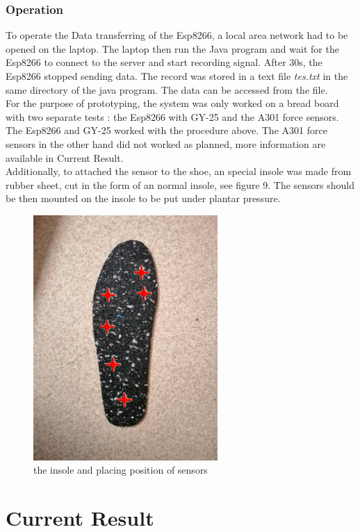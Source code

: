\documentclass[12pt,a4paper]{article}
\begin{document}
\subsubsection{Operation}
To operate the Data transferring of the Esp8266, a local area network had to be opened on the laptop. The laptop then run the Java program and wait for the Esp8266 to connect to the server and start recording signal. After 30s, the Esp8266 stopped sending data. The record was stored in a text file \textit{tes.txt} in the same directory of the java program. The data can be accessed from the file.\\ 
For the purpose of prototyping, the system was only worked on a bread board with two separate tests : the Esp8266 with GY-25 and the A301 force sensors. The Esp8266 and GY-25 worked with the procedure above. The A301 force sensors in the other hand did not worked as planned, more information are available in Current Result.\\
Additionally, to attached the sensor to the shoe, an special insole was made from rubber sheet, cut in the form of an normal insole, see figure 9. The sensors should be then mounted on the insole to be put under plantar pressure.\\
\begin{figure}
\begin{center}
\includegraphics[width = 70mm]{insole.png}
\caption{the insole and placing position of sensors}
\end{center}
\end{figure}
\section{Current Result}
\end{document}
